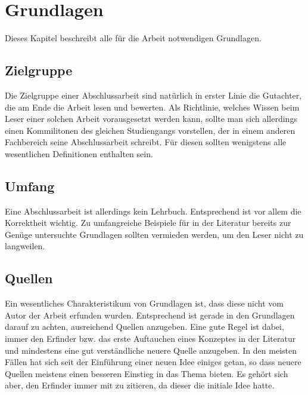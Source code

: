 
\chapter{Grundlagen}
\label{chapter-basics}

Dieses Kapitel beschreibt alle für die Arbeit notwendigen Grundlagen.

\section{Zielgruppe}

Die Zielgruppe einer Abschlussarbeit sind natürlich in erster Linie die Gutachter, die am Ende die Arbeit lesen und bewerten. Als Richtlinie, welches Wissen beim Leser einer solchen Arbeit vorausgesetzt werden kann, sollte man sich allerdings einen Kommilitonen des gleichen Studiengangs vorstellen, der in einem anderen Fachbereich seine Abschlussarbeit schreibt. Für diesen sollten wenigstens alle wesentlichen Definitionen enthalten sein.

\section{Umfang}

Eine Abschlussarbeit ist allerdings kein Lehrbuch. Entsprechend ist vor allem die Korrektheit wichtig. Zu umfangreiche Beispiele für in der Literatur bereits zur Genüge untersuchte Grundlagen sollten vermieden werden, um den Leser nicht zu langweilen.

\section{Quellen}

Ein wesentliches Charakteristikum von Grundlagen ist, dass diese nicht vom Autor der Arbeit erfunden wurden. Entsprechend ist gerade in den Grundlagen darauf zu achten, ausreichend Quellen anzugeben. Eine gute Regel ist dabei, immer den Erfinder bzw. das erste Auftauchen eines Konzeptes in der Literatur und mindestens eine gut verständliche neuere Quelle anzugeben. In den meisten Fällen hat sich seit der Einführung einer neuen Idee einiges getan, so dass neuere Quellen meistens einen besseren Einstieg in das Thema bieten. Es gehört sich aber, den Erfinder immer mit zu zitieren, da dieser die initiale Idee hatte.

